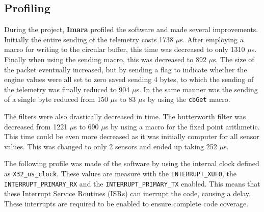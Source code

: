\documentclass{article}
\begin{document}
\subsection{Profiling}
\label{sec:profiling}
During the project, \textbf{Imara} profiled the software and made several improvements. Initially the entire sending of the telemetry costs 1738 $\mu$s. After employing a macro for writing to the circular buffer, this time was decreased to only 1310 $\mu$s. Finally when using the sending macro, this was decreased to 892 $\mu$s. The size of the packet eventually increased, but by sending a flag to indicate whether the engine values were all set to zero saved sending 4 bytes, to which the sending of the telemetry was finally reduced to 904 $\mu$s. In the same manner was the sending of a single byte reduced from 150 $\mu$s to 83 $\mu$s by using the \texttt{cbGet} macro. 

The filters were also drastically decreased in time. The butterworth filter was decreased from 1221 $\mu$s to 690 $\mu$s by using a macro for the fixed point arithmetic. This time could be even more decreased as it was initially computer for all sensor values. This was changed to only 2 sensors and ended up taking 252 $\mu$s.

The following profile was made of the software by using the internal clock defined as \texttt{X32\_us\_clock}. These values are measure with the \texttt{INTERRUPT\_XUFO}, the \texttt{INTERRUPT\_PRIMARY\_RX} and the \texttt{INTERRUPT\_PRIMARY\_TX} enabled. This means that these Interrupt Service Routines (ISRs) can inerrupt the code, causing a delay. These interrupts are required to be enabled to ensure complete code coverage.
\end{document}
